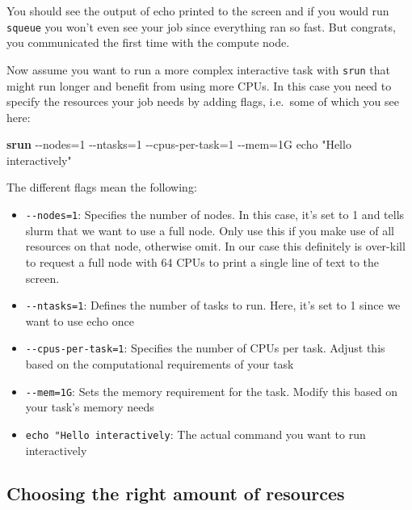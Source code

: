 \documentclass[
  letterpaper,
  DIV=11,
  numbers=noendperiod]{scrreprt}
\newenvironment{Shaded}{}{}
\newcommand{\AttributeTok}[1]{\textcolor[rgb]{0.84,0.23,0.29}{#1}}
\newcommand{\ExtensionTok}[1]{\textcolor[rgb]{0.84,0.23,0.29}{\textbf{#1}}}
\newcommand{\NormalTok}[1]{\textcolor[rgb]{0.14,0.16,0.18}{#1}}
\newcommand{\OperatorTok}[1]{\textcolor[rgb]{0.14,0.16,0.18}{#1}}
\newcommand{\StringTok}[1]{\textcolor[rgb]{0.01,0.18,0.38}{#1}}
\providecommand{\tightlist}{%
  \setlength{\itemsep}{0pt}\setlength{\parskip}{0pt}}\usepackage{longtable,booktabs,array}
\begin{document}
You should see the output of echo printed to the screen and if you would
run \texttt{squeue} you won't even see your job since everything ran so
fast. But congrats, you communicated the first time with the compute
node.

Now assume you want to run a more complex interactive task with
\texttt{srun} that might run longer and benefit from using more CPUs. In
this case you need to specify the resources your job needs by adding
flags, i.e.~some of which you see here:

\begin{Shaded}
\begin{Highlighting}[]
\ExtensionTok{srun} \AttributeTok{{-}{-}nodes}\OperatorTok{=}\NormalTok{1 }\AttributeTok{{-}{-}ntasks}\OperatorTok{=}\NormalTok{1 }\AttributeTok{{-}{-}cpus{-}per{-}task}\OperatorTok{=}\NormalTok{1 }\AttributeTok{{-}{-}mem}\OperatorTok{=}\NormalTok{1G echo }\StringTok{"Hello interactively"}
\end{Highlighting}
\end{Shaded}

The different flags mean the following:

\begin{itemize}
\tightlist
\item
  \texttt{-\/-nodes=1}: Specifies the number of nodes. In this case,
  it's set to 1 and tells slurm that we want to use a full node. Only
  use this if you make use of all resources on that node, otherwise
  omit. In our case this definitely is over-kill to request a full node
  with 64 CPUs to print a single line of text to the screen.
\item
  \texttt{-\/-ntasks=1}: Defines the number of tasks to run. Here, it's
  set to 1 since we want to use echo once
\item
  \texttt{-\/-cpus-per-task=1}: Specifies the number of CPUs per task.
  Adjust this based on the computational requirements of your task
\item
  \texttt{-\/-mem=1G}: Sets the memory requirement for the task. Modify
  this based on your task's memory needs
\item
  \texttt{echo\ "Hello\ interactively}: The actual command you want to
  run interactively
\end{itemize}

\subsection{Choosing the right amount of
resources}\label{choosing-the-right-amount-of-resources}
\end{document}
